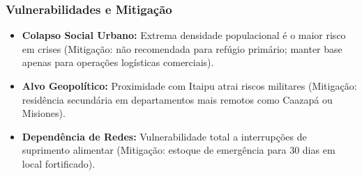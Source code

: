 \subsubsection{Vulnerabilidades e
Mitigação}

\begin{itemize}
\tightlist
\item
  \textbf{Colapso Social Urbano:} Extrema densidade populacional é o
  maior risco em crises (Mitigação: não recomendada para refúgio
  primário; manter base apenas para operações logísticas comerciais).
\item
  \textbf{Alvo Geopolítico:} Proximidade com Itaipu atrai riscos
  militares (Mitigação: residência secundária em departamentos mais
  remotos como Caazapá ou Misiones).
\item
  \textbf{Dependência de Redes:} Vulnerabilidade total a interrupções de
  suprimento alimentar (Mitigação: estoque de emergência para 30 dias em
  local fortificado).
\end{itemize}

